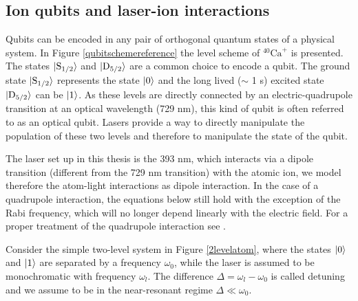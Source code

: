 \subsection{Ion qubits and laser-ion interactions}
\label{laserioninteractions}
Qubits can be encoded in any pair of orthogonal quantum states of a physical system. %
In Figure \ref{qubitschemereference} the level scheme of $^{40}\text{Ca}^+$ is presented. The states $\ket{\text{S}_{1/2}}$ and $\ket{\text{D}_{5/2}}$ are a common choice to encode a qubit. The ground state $\ket{\text{S}_{1/2}}$ represents the state $\ket{0}$ and the long lived ($\sim$ 1 s) excited state $\ket{\text{D}_{5/2}}$ can be $\ket{1}$. As these levels are directly connected by an electric-quadrupole transition at an optical wavelength (729 nm), this kind of qubit is often referred to as an optical qubit.
Lasers provide a way to directly manipulate the population of these two levels and therefore to manipulate the state of the qubit.\par
The laser set up in this thesis is the 393 nm, which interacts via a dipole transition (different from the 729 nm transition) with the atomic ion, we model therefore the atom-light interactions as dipole interaction. In the case of a quadrupole interaction, the equations below still hold with the exception of the Rabi frequency, which will no longer depend linearly with the electric field. For a proper treatment of the quadrupole interaction see \cite{ross}.\par
Consider the simple two-level system in Figure \ref{2levelatom}, where the states $\ket{0}$ and $\ket{1}$ are separated by a frequency $\omega_0$, while the laser is assumed to be monochromatic with frequency $\omega_l$. The difference $\Delta = \omega_l -\omega_0$ is called detuning and we assume to be in the near-resonant regime $\Delta \ll \omega_0$. %
